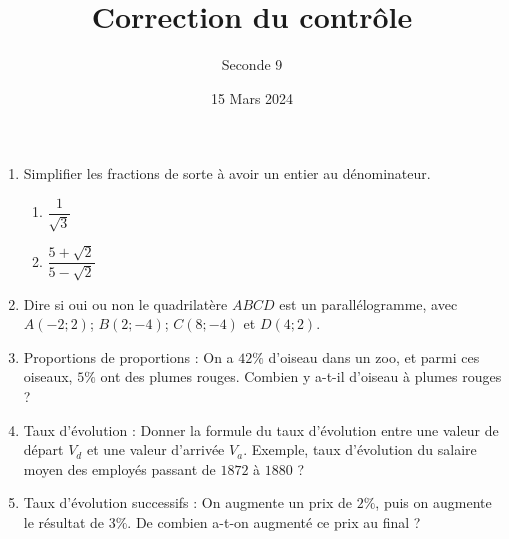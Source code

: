 \documentclass{article}
\title{Correction du contrôle}
\author{Seconde 9}
\date{15 Mars 2024}
\begin{document}
\maketitle
\thispagestyle{empty}
\begin{enumerate}[label=\textbf{Exercice \arabic* :}]
\item Simplifier les fractions de sorte à avoir un entier au dénominateur. 
\begin{enumerate}
    \item $\dfrac{1}{\sqrt{3}}$
    \item $\dfrac{5 + \sqrt{2}}{5 - \sqrt{2}}$
\end{enumerate}
\item Dire si oui ou non le quadrilatère $ABCD$ est un parallélogramme, avec $A(-2;2)$; $B(2;-4)$; $C(8;-4)$ et $D(4;2)$.
\item Proportions de proportions : On a $42\%$ d'oiseau dans un zoo, et parmi ces oiseaux, $5\%$ ont des plumes rouges. Combien y a-t-il d'oiseau à plumes rouges ?
\item Taux d'évolution : Donner la formule du taux d'évolution entre une valeur de départ $V_d$ et une valeur d'arrivée $V_a$. Exemple, taux d'évolution du salaire moyen des employés passant de $1872$ à $1880$ ?
\item Taux d'évolution successifs : On augmente un prix de $2\%$, puis on augmente le résultat de $3\%$. De combien a-t-on augmenté ce prix au final ?
\end{enumerate}
\end{document}

